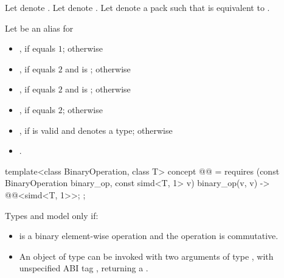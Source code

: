\begin{itemdescr}
\pnum
Let  denote .
Let  denote .
Let  denote a pack such that  is equivalent
to .

\pnum
Let  be an alias for
\begin{itemize}
 \item
   , if  equals $1$;
   otherwise
 \item
   , if  equals $2$ and
    is ; otherwise
 \item
   , if
    equals $2$ and
   is ; otherwise
 \item
   , if
    equals $2$; otherwise
 \item
   , if
    is valid and denotes a type;
   otherwise
 \item
   .
\end{itemize}
\end{itemdescr}

\begin{itemdecl}
template<class BinaryOperation, class T>
  concept @@ =
    requires (const BinaryOperation binary_op, const simd<T, 1> v) {
      { binary_op(v, v) } -> @@<simd<T, 1>>;
    };
\end{itemdecl}

\begin{itemdescr}
\pnum
Types  and  model
 only if:
\begin{itemize}
\item {} is a binary element-wise operation and the
operation is commutative.

\item An object of type  can be invoked with two
arguments of type , with unspecified ABI tag
, returning a .
\end{itemize}
\end{itemdescr}

